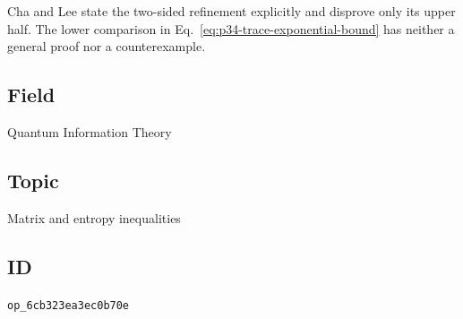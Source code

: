Cha and Lee state the two-sided refinement explicitly and disprove only its
upper half.  The lower comparison in
Eq.~\eqref{eq:p34-trace-exponential-bound} has neither a general proof nor a
counterexample.

\subsection*{Field}

Quantum Information Theory

\subsection*{Topic}

Matrix and entropy inequalities

\subsection*{ID}

\texttt{op\_6cb323ea3ec0b70e}
